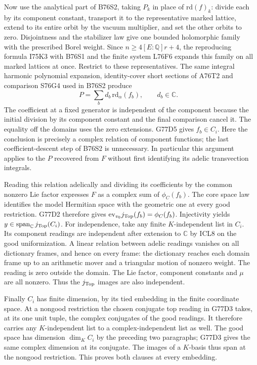 Now use the analytical part of B76S2, taking $P_k$ in place
of $\mathrm{rd}(f)_k$: divide each by its component constant,
transport it to the representative marked lattice, extend to
its entire orbit by the vacuum multiplier, and set the other
orbits to zero. Disjointness and the stabilizer law give one
bounded holomorphic family with the prescribed Borel weight.
Since $n\ge4[E:\mathbb Q]r+4$, the reproducing formula I75K3
with B76S1 and the finite system L76F6 expands this family on
all marked lattices at once. Restrict to these representatives.
The same integral harmonic polynomial expansion, identity-cover
short sections of A76T2 and comparison S76G4 used in B76S2
produce
\[
        P = \sum_b d_b\,\mathrm{rd}_\alpha(f_b),\qquad d_b\in\mathbb C .
\]
The coefficient at a fixed generator is independent of the
component because the initial division by its component constant
and the final comparison cancel it. The equality off the
domains uses the zero extensions. G77D5 gives $f_b\in C_i$.
Here the conclusion is precisely a complex relation of component
functions; the last coefficient-descent step of B76S2 is unnecessary.
In particular this argument applies to the $P$ recovered from $F$
without first identifying its adelic transvection integrals.

Reading this relation adelically and dividing its coefficients by
the common nonzero Lie factor expresses $F$ as a complex sum of
$\phi_C(f_b)$. The core space law identifies the model Hermitian
space with the geometric one at every good restriction. G77D2
therefore gives $\mathrm{ev}_{v_0}j_{\rm Top}(f_b)=\phi_C(f_b)$.
Injectivity yields $y\in\operatorname{span}_{\mathbb C}j_{\rm Top}(C_i)$.
For independence, take any finite $K$-independent list in $C_i$.
Its component readings are independent after extension to
$\mathbb C$ by ICL8 on the good uniformization. A linear relation
between adelic readings vanishes on all dictionary frames, and
hence on every frame: the dictionary reaches each domain frame
up to an arithmetic mover and a triangular motion of nonzero
weight. The reading is zero outside the domain. The Lie factor,
component constants and $\mu$ are all nonzero. Thus the
$j_{\rm Top}$ images are also independent.

Finally $C_i$ has finite dimension, by its tied embedding in the
finite coordinate space. At a nongood restriction the chosen
conjugate top reading in G77D3 takes, at its one unit tuple, the
complex conjugates of the good readings. It therefore carries any
$K$-independent list to a complex-independent list as well.
The good space has dimension $\dim_K C_i$ by the preceding two
paragraphs; G77D3 gives the same complex dimension at its
conjugate. The images of a $K$-basis thus span at the nongood
restriction. This proves both clauses at every embedding.


